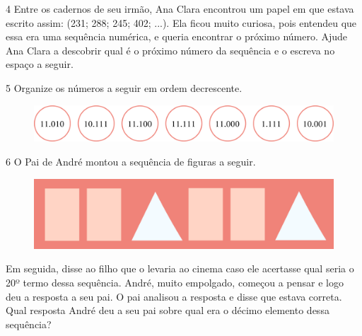 \num{4} Entre os cadernos de seu irmão, Ana Clara encontrou um papel em que estava escrito assim: (231; 288; 245; 402; ...). Ela ficou muito curiosa, pois entendeu que essa era uma sequência
numérica, e queria encontrar o próximo número. Ajude Ana Clara a descobrir qual é o próximo número da sequência e o escreva no espaço a seguir.

\begin{mdframed}[linewidth=2pt,linecolor=salmao,roundcorner=2pt]
\vspace{4.5cm}
\end{mdframed}

\pagebreak
\num{5} Organize os números a seguir em ordem decrescente.

\begin{figure}[htpb!]
\centering
\includegraphics[width=\textwidth]{media/image18.png}
\end{figure}

\begin{mdframed}[linewidth=2pt,linecolor=salmao,roundcorner=2pt]
\end{mdframed}

\num{6} O Pai de André montou a sequência de figuras a seguir.

\begin{figure}[htpb!]
\centering
\includegraphics[width=\textwidth]{media/image19.png}
\end{figure}

Em seguida, disse ao filho que o levaria ao cinema caso ele acertasse
qual seria o 20º termo dessa sequência. André, muito empolgado, começou a
pensar e logo deu a resposta a seu pai. O pai analisou a resposta e
disse que estava correta. Qual resposta André deu a seu pai sobre qual era o décimo elemento
dessa sequência?

